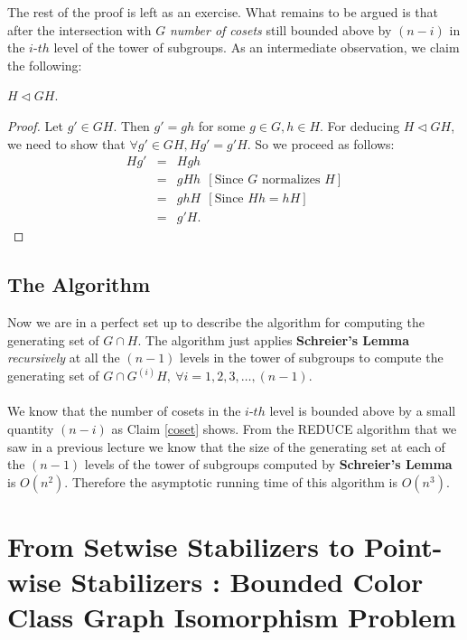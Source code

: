 The rest of the proof is left as an exercise. What remains to be argued is that after the intersection with $G$ \emph{number of cosets} still bounded above by $(n-i)$ in the $i$-$th$ level of the tower of subgroups. As an intermediate observation, we claim the following:
\begin{claim}
	$H\triangleleft GH$.
\end{claim}
\begin{proof}
	Let $g'\in GH$. Then $g' = gh$ for some $g\in G, h\in H$. For deducing $H\triangleleft GH$, we need to show that $\forall g'\in GH, Hg' = g'H$. So we proceed as follows:
	\begin{eqnarray*}
		Hg' &=& Hgh\\
			&=& gHh~~[\text{Since }G\text{ normalizes }H]\\
			&=& ghH~~[\text{Since }Hh = hH]\\
			&=& g'H.
	\end{eqnarray*}
\end{proof}
\subsection{The Algorithm}
Now we are in a perfect set up to describe the algorithm for computing the generating set of $G\cap H$. The algorithm just applies {\bf Schreier's Lemma} \emph{recursively} at all the $(n-1)$ levels in the tower of subgroups to compute the generating set of $G\cap G^{(i)}H,~\forall i=1,2,3,\ldots,(n-1)$.\\\\We know that the number of cosets in the $i$-$th$ level is bounded above by a small quantity $(n-i)$ as Claim \ref{coset} shows. From the REDUCE algorithm that we saw in a previous lecture we know that the size of the generating set at each of the $(n-1)$ levels of the tower of subgroups computed by {\bf Schreier's Lemma} is $O(n^2)$. Therefore the asymptotic running time of this algorithm is $O(n^3)$.


\section{From Setwise Stabilizers to Point-wise Stabilizers : Bounded Color Class Graph Isomorphism Problem}

